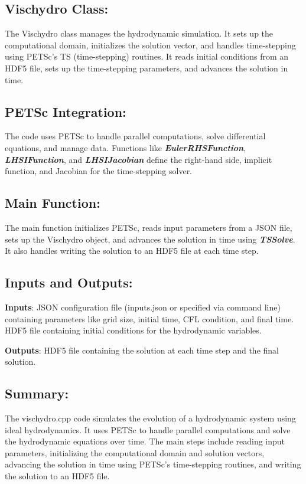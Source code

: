 \documentclass{article}
\begin{document}
\subsection{Vischydro Class:}
The Vischydro class manages the hydrodynamic simulation. It sets up the computational domain, initializes the solution vector, and handles time-stepping using PETSc's TS (time-stepping) routines. It reads initial conditions from an HDF5 file, sets up the time-stepping parameters, and advances the solution in time.

\subsection{PETSc Integration:}
The code uses PETSc to handle parallel computations, solve differential equations, and manage data. Functions like \textbf{\textit{EulerRHSFunction}}, \textbf{\textit{LHSIFunction}}, and \textbf{\textit{LHSIJacobian}} define the right-hand side, implicit function, and Jacobian for the time-stepping solver.

\subsection{Main Function:}
The main function initializes PETSc, reads input parameters from a JSON file, sets up the Vischydro object, and advances the solution in time using \textbf{\textit{TSSolve}}. It also handles writing the solution to an HDF5 file at each time step.

\subsection{Inputs and Outputs:}
\textbf{Inputs}: JSON configuration file (inputs.json or specified via command line) containing parameters like grid size, initial time, CFL condition, and final time. HDF5 file containing initial conditions for the hydrodynamic variables.

\textbf{Outputs}: HDF5 file containing the solution at each time step and the final solution.

\subsection{Summary:}
The vischydro.cpp code simulates the evolution of a hydrodynamic system using ideal hydrodynamics. It uses PETSc to handle parallel computations and solve the hydrodynamic equations over time. The main steps include reading input parameters, initializing the computational domain and solution vectors, advancing the solution in time using PETSc's time-stepping routines, and writing the solution to an HDF5 file.
\end{document}
